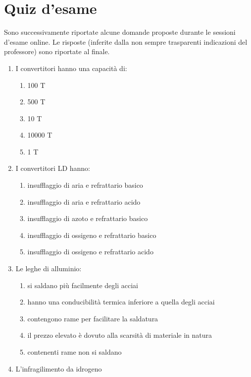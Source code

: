 
\chapter{Quiz d'esame}

Sono successivamente riportate alcune domande proposte durante le sessioni d'esame online. Le risposte (inferite dalla non sempre trasparenti indicazioni del professore) sono riportate al finale.

\begin{enumerate}
    \item I convertitori hanno una capacità di:
    \begin{enumerate}
        \item 100 T
        \item 500 T
        \item 10 T
        \item 10000 T
        \item 1 T
    \end{enumerate}
    \item I convertitori LD hanno:
    \begin{enumerate}
        \item insufflaggio di aria e refrattario basico
        \item insufflaggio di aria e refrattario acido
        \item insufflaggio di azoto e refrattario basico
        \item insufflaggio di ossigeno e refrattario basico
        \item insufflaggio di ossigeno e refrattario acido
    \end{enumerate}
    \item Le leghe di alluminio:
    \begin{enumerate}
        \item si saldano più facilmente degli acciai
        \item hanno una conducibilità termica inferiore a quella degli acciai
        \item contengono rame per facilitare la saldatura
        \item il prezzo elevato è dovuto alla scarsità di materiale in natura
        \item contenenti rame non si saldano
    \end{enumerate}
    \item L’infragilimento da idrogeno
    \begin{enumerate}

\end{enumerate}
\end{enumerate}

